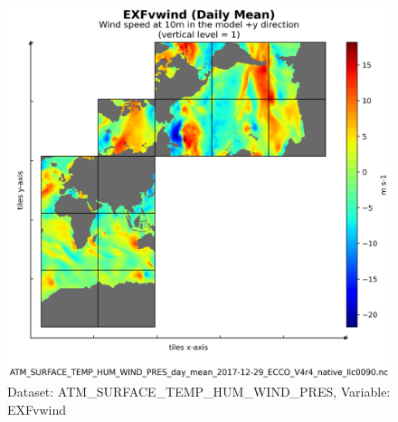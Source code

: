 \begin{figure}[H]
\centering
\includegraphics[scale=0.55]{../images/plots/native_plots/Atmosphere_Surface_Temperature_Humidity_Wind_and_Pressure/EXFvwind.png}
\caption{Dataset: ATM\_SURFACE\_TEMP\_HUM\_WIND\_PRES, Variable: EXFvwind}
\label{tab:table-ATM_SURFACE_TEMP_HUM_WIND_PRES_EXFvwind-Plot}
\end{figure}
\newpage
\pagebreak
